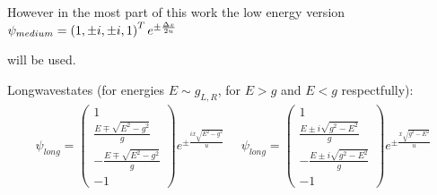 However in the most part of this work the low energy version $\psi_{medium}=
\left(
1,
\pm i,
\pm i,
1
\right)^T
e^{\pm\frac{\Delta x}{2u}}  $

will be used.

Longwavestates (for energies $ E\sim g_{L,R} $, for $ E>g $ and $ E<g $ respectfully):
\begin{gather}
		\psi_{long}
=
\begin{pmatrix}
1\\
\frac{E\mp \sqrt{E^2-g^2}}{g}\\
-\frac{E\mp \sqrt{E^2-g^2}}{g}\\
-1
\end{pmatrix}
e^{\pm\frac{ix\sqrt{E^2-g^2}}{u}}
~~~~~~
	\psi_{long}
	=
	\begin{pmatrix}
	1\\
	\frac{E\pm i\sqrt{g^2-E^2}}{g}\\
	-\frac{E\pm i\sqrt{g^2-E^2}}{g}\\
	-1
	\end{pmatrix}
	e^{\pm\frac{x\sqrt{g^2-E^2}}{u}}
\end{gather}